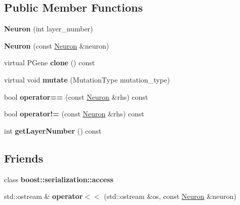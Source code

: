 \subsection*{Public Member Functions}
\begin{DoxyCompactItemize}
\item 
{\bfseries Neuron} (int layer\+\_\+number)\hypertarget{classNeuron_aaaec837656bd4297894e31894976798c}{}\label{classNeuron_aaaec837656bd4297894e31894976798c}

\item 
{\bfseries Neuron} (const \hyperlink{classNeuron}{Neuron} \&neuron)\hypertarget{classNeuron_a03214e3a9896fc827ad081c9ba79da88}{}\label{classNeuron_a03214e3a9896fc827ad081c9ba79da88}

\item 
virtual P\+Gene {\bfseries clone} () const \hypertarget{classNeuron_ad5415199448e7b7c121b6c611251733d}{}\label{classNeuron_ad5415199448e7b7c121b6c611251733d}

\item 
virtual void {\bfseries mutate} (Mutation\+Type mutation\+\_\+type)\hypertarget{classNeuron_a68fd2220abf655ddf5bed07241af2746}{}\label{classNeuron_a68fd2220abf655ddf5bed07241af2746}

\item 
bool {\bfseries operator==} (const \hyperlink{classNeuron}{Neuron} \&rhs) const \hypertarget{classNeuron_a27cbe8fe114357e3b76028b6d6a53ba4}{}\label{classNeuron_a27cbe8fe114357e3b76028b6d6a53ba4}

\item 
bool {\bfseries operator!=} (const \hyperlink{classNeuron}{Neuron} \&rhs) const \hypertarget{classNeuron_a7fa60e1dde3ee05eb8edd238cd718d18}{}\label{classNeuron_a7fa60e1dde3ee05eb8edd238cd718d18}

\item 
int {\bfseries get\+Layer\+Number} () const \hypertarget{classNeuron_a5cd7ad3ac7abda10e8e1c97694139bea}{}\label{classNeuron_a5cd7ad3ac7abda10e8e1c97694139bea}

\end{DoxyCompactItemize}
\subsection*{Friends}
\begin{DoxyCompactItemize}
\item 
class {\bfseries boost\+::serialization\+::access}\hypertarget{classNeuron_ac98d07dd8f7b70e16ccb9a01abf56b9c}{}\label{classNeuron_ac98d07dd8f7b70e16ccb9a01abf56b9c}

\item 
std\+::ostream \& {\bfseries operator$<$$<$} (std\+::ostream \&os, const \hyperlink{classNeuron}{Neuron} \&neuron)\hypertarget{classNeuron_ae5604409859b602533fbbff506a8ccca}{}\label{classNeuron_ae5604409859b602533fbbff506a8ccca}

\end{DoxyCompactItemize}
